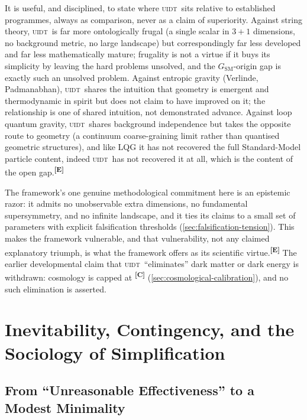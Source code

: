 \documentclass[12pt,a4paper,twoside]{article}
\theoremstyle{plain}
\theoremstyle{definition}
\theoremstyle{remark}
\newcommand{\UIDT}{\textsc{uidt}}
\newcommand{\catmark}[1]{\textsuperscript{\textsf{\textbf{[#1]}}}}
\begin{document}
It is useful, and disciplined, to state where \UIDT\ sits relative to established programmes, always as comparison, never as a claim of superiority. Against string theory, \UIDT\ is far more ontologically frugal (a single scalar in $3+1$ dimensions, no background metric, no large landscape) but correspondingly far less developed and far less mathematically mature; frugality is not a virtue if it buys its simplicity by leaving the hard problems unsolved, and the $G_{\mathrm{SM}}$-origin gap is exactly such an unsolved problem. Against entropic gravity (Verlinde, Padmanabhan), \UIDT\ shares the intuition that geometry is emergent and thermodynamic in spirit but does not claim to have improved on it; the relationship is one of shared intuition, not demonstrated advance. Against loop quantum gravity, \UIDT\ shares background independence but takes the opposite route to geometry (a continuum coarse-graining limit rather than quantised geometric structures), and like LQG it has not recovered the full Standard-Model particle content, indeed \UIDT\ has not recovered it at all, which is the content of the open gap.\catmark{E}

The framework's one genuine methodological commitment here is an epistemic razor: it admits no unobservable extra dimensions, no fundamental supersymmetry, and no infinite landscape, and it ties its claims to a small set of parameters with explicit falsification thresholds (\cref{sec:falsification-tension}). This makes the framework vulnerable, and that vulnerability, not any claimed explanatory triumph, is what the framework offers as its scientific virtue.\catmark{E} The earlier developmental claim that \UIDT\ ``eliminates'' dark matter or dark energy is withdrawn: cosmology is capped at \catmark{C} (\cref{sec:cosmological-calibration}), and no such elimination is asserted.

\section{Inevitability, Contingency, and the Sociology of Simplification}
\label{sec:inevitability-sociology}

\subsection{From ``Unreasonable Effectiveness'' to a Modest Minimality}
\label{subsec:inevitability}
\end{document}
